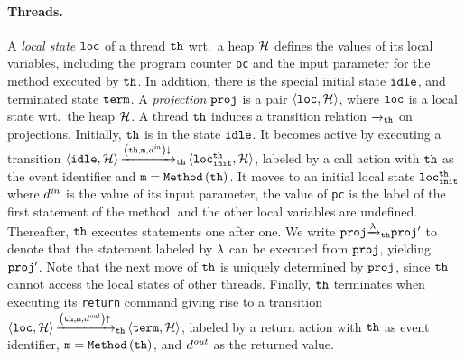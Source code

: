 \paragraph{Threads.}
A {\it local state} ${\tt loc}$ of a thread ${\tt th}$
wrt.\ a heap ${\mathcal H}$ defines 
the values of its local variables, including the program counter
{\tt pc} and the input parameter for the method executed by ${\tt th}$.
In addition, there is the special initial state ${\tt idle}$,
and terminated state ${\tt term}$.
%
A {\em projection} ${\tt proj}$ is a pair
$\left\langle{\tt loc},{\mathcal H}\right\rangle$, where ${\tt loc}$
is a local state wrt.\  the heap ${\mathcal H}$.
%
A thread ${\tt th}$ induces a transition relation ${\xrightarrow{}{}}_{\!\!{\tt th}}$
on projections.
%
Initially, ${\tt th}$ is in the state ${\tt idle}$.
%
It becomes active by executing a transition
$\left\langle{\tt idle},{\mathcal H}\right\rangle
{\xrightarrow{{\left({\tt th},{\tt m},d^{\it in}\right)\downarrow}}{}}_{\!\!{\tt th}}
\left\langle{\tt loc}_{\tt init}^{{\tt th}},{\mathcal H}\right\rangle$,
labeled by a call action with ${\tt th}$ as the event identifier and
${\tt m}={\tt Method}\left({\tt th}\right)$.
It moves to an initial local state ${\tt loc}_{\tt init}^{{\tt th}}$
where $d^{\it in}$ is the value of its input parameter,
the value of {\tt pc} is the label of the first statement of the method, and
the other local variables are undefined.
%
Thereafter, ${\tt th}$ executes statements one after one.
%
We write ${\tt proj}{\xrightarrow{\lambda}{}}_{\!\!{\tt th}}{\tt proj}'$ 
to denote that the statement labeled by $\lambda$ can be executed
from ${\tt proj}$, yielding ${\tt proj}'$.
Note that the next move of ${\tt th}$ is uniquely determined
by ${\tt proj}$, since ${\tt th}$ cannot access
the local states of other threads.
%
Finally, ${\tt th}$ terminates
when executing its {\tt return} command
giving rise to a transition
$\left\langle{\tt loc},{\mathcal H}\right\rangle{\xrightarrow{\left({\tt th},{\tt m},d^{\it out}\right)\uparrow}{}}_{\!\!{\tt th}}
\left\langle{\tt term},{\mathcal H}\right\rangle$, labeled 
by a return action with ${\tt th}$ as event identifier,
${\tt m}={\tt Method}\left({\tt th}\right)$, and $d^{\it out}$
as the returned value.
%

